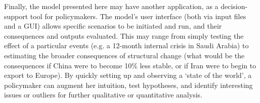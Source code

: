 \documentclass{llncs}
\begin{document}
Finally, the model presented here may have another application, as a decision-support tool for policymakers. The model's user interface (both via input files and a GUI) allows specific scenarios to be initiated and run, and their consequences and outputs evaluated. This may range from simply testing the effect of a particular events (e.g. a 12-month internal crisis in Saudi Arabia) to estimating the broader consequences of structural change (what would be the consequences if China were to become 10\% less stable, or if Iran were to begin to export to Europe). By quickly setting up and observing a `state of the world', a policymaker can augment her intuition, test hypotheses, and identify interesting issues or outliers for further qualitative or quantitative analysis. 



\end{document}
